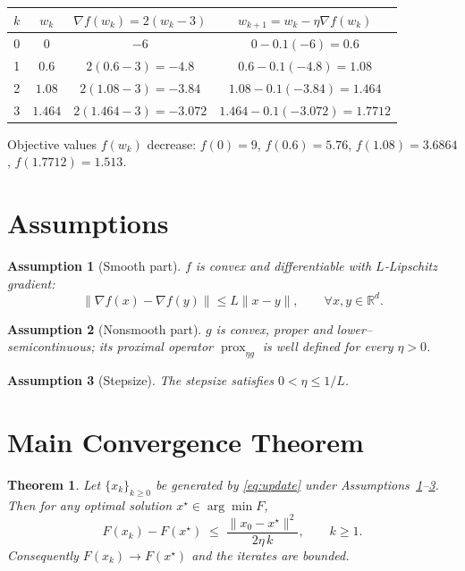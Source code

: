 \documentclass{article}
\newtheorem{theorem}{Theorem}
\newtheorem{assumption}{Assumption}
\newcommand{\prox}{\operatorname{prox}}
\newcommand{\grad}{\nabla}
\newcommand{\R}{\mathbb{R}}
\begin{document}
\begin{center}
\begin{tabular}{c|c|c|c}
$k$ & $w_{k}$ & $\grad f(w_{k})=2(w_{k}-3)$ & $w_{k+1}=w_{k}-\eta\grad f(w_{k})$\\\hline
0 & $0$ & $-6$ & $0-0.1(-6)=0.6$ \\
1 & $0.6$ & $2(0.6-3)=-4.8$ & $0.6-0.1(-4.8)=1.08$\\
2 & $1.08$ & $2(1.08-3)=-3.84$ & $1.08-0.1(-3.84)=1.464$\\
3 & $1.464$ & $2(1.464-3)=-3.072$ & $1.464-0.1(-3.072)=1.7712$
\end{tabular}
\end{center}
Objective values $f(w_{k})$ decrease:
$f(0)=9$, $f(0.6)=5.76$, $f(1.08)=3.6864$, $f(1.7712)=1.513$.

\section*{Assumptions}
\begin{assumption}[Smooth part]
\label{ass:smooth}
$f$ is convex and differentiable with $L$‑Lipschitz gradient:
\[
\|\grad f(x)-\grad f(y)\|\le L\|x-y\|,\qquad\forall x,y\in\R^{d}.
\]
\end{assumption}
\begin{assumption}[Nonsmooth part]
\label{ass:non}
$g$ is convex, proper and lower–semicontinuous; its proximal operator
$\prox_{\eta g}$ is well defined for every $\eta>0$.
\end{assumption}
\begin{assumption}[Stepsize]
\label{ass:stepsize}
The stepsize satisfies $0<\eta\le 1/L$.
\end{assumption}

\section*{Main Convergence Theorem}
\begin{theorem}
\label{thm:convergence}
Let $\{x_{k}\}_{k\ge0}$ be generated by \eqref{eq:update} under
Assumptions~\ref{ass:smooth}–\ref{ass:stepsize}.
Then for any optimal solution $x^{\star}\in\arg\min F$,
\begin{equation}
\label{eq:rate}
F(x_{k})-F(x^{\star})\;\le\;\frac{\|x_{0}-x^{\star}\|^{2}}{2\eta\,k},
\qquad k\ge1.
\end{equation}
Consequently $F(x_{k})\to F(x^{\star})$ and the iterates are bounded.
\end{theorem}
\end{document}
